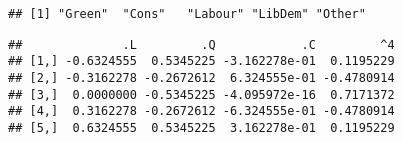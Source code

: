 \documentclass[
]{article}
\newenvironment{Shaded}{\begin{snugshade}}{\end{snugshade}}
\newcommand{\FunctionTok}[1]{\textcolor[rgb]{0.00,0.00,0.00}{#1}}
\newcommand{\NormalTok}[1]{#1}
\newcommand{\SpecialCharTok}[1]{\textcolor[rgb]{0.00,0.00,0.00}{#1}}
\begin{document}
\begin{verbatim}
## [1] "Green"  "Cons"   "Labour" "LibDem" "Other"
\end{verbatim}

\begin{Shaded}
\end{Shaded}

\begin{verbatim}
##              .L         .Q            .C         ^4
## [1,] -0.6324555  0.5345225 -3.162278e-01  0.1195229
## [2,] -0.3162278 -0.2672612  6.324555e-01 -0.4780914
## [3,]  0.0000000 -0.5345225 -4.095972e-16  0.7171372
## [4,]  0.3162278 -0.2672612 -6.324555e-01 -0.4780914
## [5,]  0.6324555  0.5345225  3.162278e-01  0.1195229
\end{verbatim}
\end{document}
